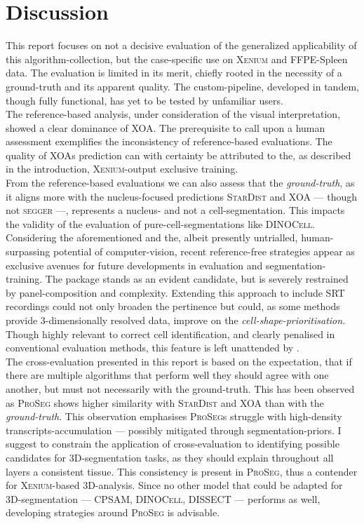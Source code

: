 \section*{Discussion}
This report focuses on not a decisive evaluation of the generalized applicability of this algorithm-collection, but the case-specific use on \textsc{Xenium} and FFPE-Spleen data. The evaluation is limited in its merit, chiefly rooted in the necessity of a ground-truth and its apparent quality. The custom-pipeline, developed in tandem, though fully functional, has yet to be tested by unfamiliar users.\\
The reference-based analysis, under consideration of the visual interpretation, showed a clear dominance of \textsc{XOA}. The prerequisite to call upon a human assessment exemplifies the inconsistency of reference-based evaluations. The quality of \textsc{XOA}s prediction can with certainty be attributed to the, as described in the introduction, \textsc{Xenium}-output exclusive training.\\
From the reference-based evaluations we can also assess that the \emph{ground-truth}, as it aligns more with the nucleus-focused predictions \textsc{StarDist} and \textsc{XOA} --- though not \textsc{segger} ---, represents a nucleus- and not a cell-segmentation. This impacts the validity of the evaluation of pure-cell-segmentations like \textsc{DINOCell}.\\
Considering the aforementioned and the, albeit presently untrialled, human-surpassing potential of computer-vision, recent reference-free strategies appear as exclusive avenues for future developments in evaluation and segmentation-training. The  package stands as an evident candidate, but is severely restrained by panel-composition and complexity. Extending this approach to include SRT recordings could not only broaden the pertinence but could, as some methods provide 3-dimensionally resolved data, improve on the \emph{cell-shape-prioritisation}. Though highly relevant to correct cell identification, and clearly penalised in conventional evaluation methods, this feature is left unattended by .\\
The cross-evaluation presented in this report is based on the expectation, that if there are multiple algorithms that perform well they should agree with one another, but must not necessarily with the ground-truth. This has been observed as \textsc{ProSeg} shows higher similarity with \textsc{StarDist} and \textsc{XOA} than with the \emph{ground-truth}. This observation emphasises \textsc{ProSeg}s struggle with high-density transcripts-accumulation --- possibly mitigated through segmentation-priors. I suggest to constrain the application of cross-evaluation to identifying possible candidates for 3D-segmentation tasks, as they should explain throughout all layers a consistent tissue. This consistency is present in \textsc{ProSeg}, thus a contender for \textsc{Xenium}-based 3D-analysis. Since no other model that could be adapted for 3D-segmentation --- \textsc{CPSAM, DINOCell, DISSECT} --- performs as well, developing strategies around \textsc{ProSeg} is advisable.\\
